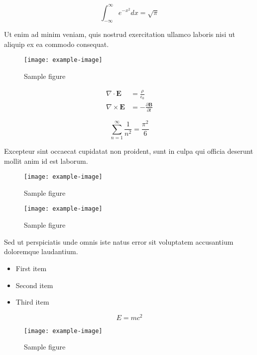 \documentclass{article}
\begin{document}
\begin{equation}
    \int_{-\infty}^{\infty} e^{-x^2} dx = \sqrt{\pi}
\end{equation}

Ut enim ad minim veniam, quis nostrud exercitation ullamco laboris nisi ut aliquip ex ea commodo consequat.

\begin{figure}[h]
    \centering
    \texttt{[image: example-image]}
    \caption{Sample figure}
    \label{fig:sample}
\end{figure}

\begin{align}
    \nabla \cdot \mathbf{E} &= \frac{\rho}{\epsilon_0} \\
    \nabla \times \mathbf{E} &= -\frac{\partial \mathbf{B}}{\partial t}
\end{align}

\begin{equation}
    \sum_{n=1}^{\infty} \frac{1}{n^2} = \frac{\pi^2}{6}
\end{equation}

Excepteur sint occaecat cupidatat non proident, sunt in culpa qui officia deserunt mollit anim id est laborum.


\begin{figure}[h]
    \centering
    \texttt{[image: example-image]}
    \caption{Sample figure}
    \label{fig:sample}
\end{figure}

\begin{figure}[h]
    \centering
    \texttt{[image: example-image]}
    \caption{Sample figure}
    \label{fig:sample}
\end{figure}

Sed ut perspiciatis unde omnis iste natus error sit voluptatem accusantium doloremque laudantium.

\begin{itemize}
\item First item
\item Second item
\item Third item
\end{itemize}

\begin{equation}
    E = mc^2
\end{equation}

\begin{figure}[h]
    \centering
    \texttt{[image: example-image]}
    \caption{Sample figure}
    \label{fig:sample}
\end{figure}
\end{document}
